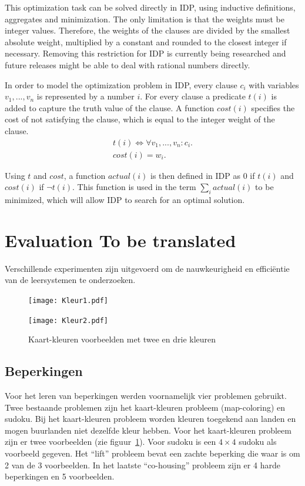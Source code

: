 \documentclass{llncs}
\begin{document}
This optimization task can be solved directly in IDP, using inductive definitions, aggregates and minimization.
The only limitation is that the weights must be integer values.
Therefore, the weights of the clauses are divided by the smallest absolute weight, multiplied by a constant and rounded to the closest integer if necessary.
Removing this restriction for IDP is currently being researched and future releases might be able to deal with rational numbers directly.

In order to model the optimization problem in IDP, every clause $c_i$ with variables $v_1, ..., v_n$ is represented by a number $i$. For every clause a predicate $t(i)$ is added to capture the truth value of the clause.
A function $\mathit{cost}(i)$ specifies the cost of not satisfying the clause, which is equal to the integer weight of the clause.
\begin{eqnarray*}
  t(i) \Leftrightarrow \forall v_1, ..., v_n : c_i. \\
  cost(i) = w_i.
\end{eqnarray*}

Using $t$ and $\mathit{cost}$, a function $\mathit{actual}(i)$ is then defined in IDP as 0 if $t(i)$ and $\mathit{cost}(i)$ if $\lnot t(i)$.
This function is used in the term $\sum_i actual(i)$ to be minimized, which will allow IDP to search for an optimal solution.

\section{Evaluation  {\color{red} To be translated}}
Verschillende experimenten zijn uitgevoerd om de nauwkeurigheid en effici\"entie van de leersystemen te onderzoeken.

\begin{figure}
  \centering
  \begin{minipage}{.49\linewidth}
    \centering
    \texttt{[image: Kleur1.pdf]}
  \end{minipage}
  \begin{minipage}{.49\linewidth}
    \centering
    \texttt{[image: Kleur2.pdf]}
  \end{minipage}
  \caption{Kaart-kleuren voorbeelden met twee en drie kleuren}
  \label{fig:map_color}
\end{figure}

\subsection{Beperkingen}
Voor het leren van beperkingen werden voornamelijk vier problemen gebruikt.
Twee bestaande problemen zijn het kaart-kleuren probleem (map-coloring) en sudoku.
Bij het kaart-kleuren probleem worden kleuren toegekend aan landen en mogen buurlanden niet dezelfde kleur hebben.
Voor het kaart-kleuren probleem zijn er twee voorbeelden (zie figuur~\ref{fig:map_color}).
Voor sudoku is een $4 \times 4$ sudoku als voorbeeld gegeven.
Het ``lift'' probleem bevat een zachte beperking die waar is om 2 van de 3 voorbeelden.
In het laatste ``co-housing'' probleem zijn er 4 harde beperkingen en 5 voorbeelden.
\end{document}
